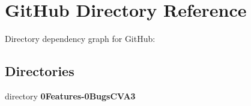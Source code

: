 \section{Git\-Hub Directory Reference}
\label{dir_2574d9408e4f5346b90b61e8927cd493}
Directory dependency graph for Git\-Hub\-:
\subsection*{Directories}
\begin{DoxyCompactItemize}
\item 
directory {\bf 0\-Features-\/0\-Bugs\-C\-V\-A3}
\end{DoxyCompactItemize}
